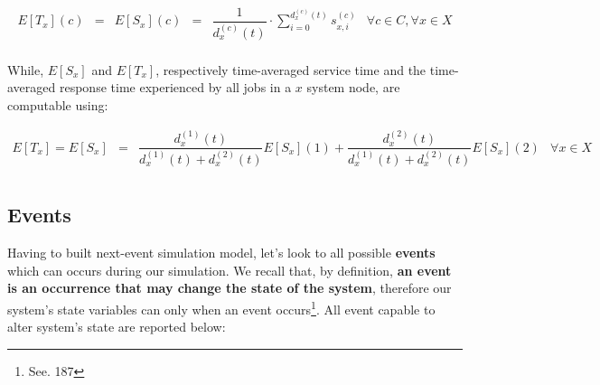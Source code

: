 \documentclass[10pt,a4paper]{article}
\begin{document}
\begin{equation}
\begin{array} {rccccr} 
E[T_x](c) & = & E[S_x](c) & = & \displaystyle \dfrac{1}{d_x^{(c)}(t)} \cdot \sum_{i = 0}^{d_x^{(c)}(t)} s_{x,i}^{(c)} & \forall c \in C, \forall x \in X \\
\end{array}
\end{equation}

While, $E[S_x]$ and $E[T_x]$, respectively time-averaged service time and the time-averaged response time experienced by all jobs in a $x$ system node, are computable using:

\begin{equation}
\begin{array} {rccr} 
E[T_x] = E[S_x] & = & \dfrac{d_x^{(1)}(t)}{d_x^{(1)}(t) + d_x^{(2)}(t)}E[S_x](1) + \dfrac{d_x^{(2)}(t)}{d_x^{(1)}(t) + d_x^{(2)}(t)}E[S_x](2) & \forall x \in X \\
\end{array}
\end{equation}





\subsection{Events}

Having to built next-event simulation model, let's look to all possible \textbf{events} which can occurs during our simulation. We recall that, by definition, \textbf{an event is an occurrence that may change the state of the system}, therefore our system's state variables can only when an event occurs\footnote{See. 187}. All event capable to alter system's state are reported below:
\end{document}
